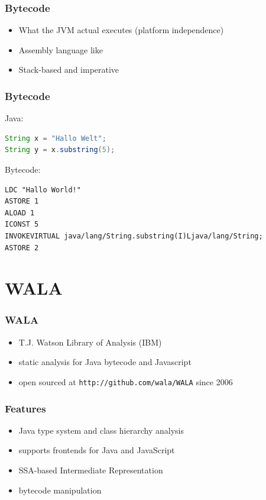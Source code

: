 \documentclass{beamer}
\begin{document}
\frame{\sectionpage}

\begin{frame}
   \frametitle{Bytecode}
   \begin{itemize}
      \item What the JVM actual executes (platform independence)
      \item Assembly language like 
      \item Stack-based and imperative
   \end{itemize}    
\end{frame}


\begin{frame}[fragile]
  \frametitle{Bytecode}
  Java:
  \begin{lstlisting}[language=Java]
String x = "Hallo Welt";
String y = x.substring(5);
  \end{lstlisting}%
  Bytecode:
  \begin{lstlisting}[language=Bytecode]
LDC "Hallo World!"
ASTORE 1
ALOAD 1
ICONST 5
INVOKEVIRTUAL java/lang/String.substring(I)Ljava/lang/String;
ASTORE 2
  \end{lstlisting}  
\end{frame}

\section{WALA}

\begin{frame}
  \frametitle{WALA}
  \begin{itemize}
    \item T.J. Watson Library of Analysis (IBM)
    \item static analysis for Java bytecode and Javascript
    \item open sourced at \texttt{http://github.com/wala/WALA} since 2006
  \end{itemize}

\end{frame}


\begin{frame}
  \frametitle{Features}
  
  \begin{itemize}
    \item Java type system and class hierarchy analysis
    \item supports frontends for Java and JavaScript
    \item SSA-based Intermediate Representation
    \item bytecode manipulation 
  \end{itemize}
  
\end{frame}
\end{document}
